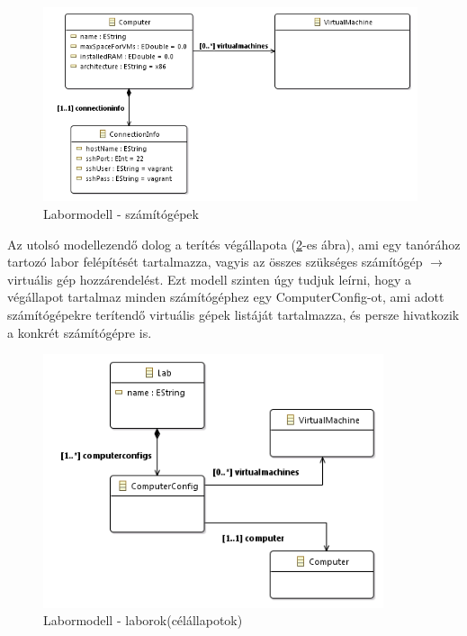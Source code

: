 \vspace{0.5cm}

\begin{figure}[ht]
	\centering
	\includegraphics[width=110mm, keepaspectratio]{figures/design_computer.png}
	\caption{Labormodell - számítógépek}
	\label{fig:designcomputers}
\end{figure}

\vspace{0.5cm}

Az utolsó modellezendő dolog a terítés végállapota (\ref{fig:designlab}-es ábra), ami egy tanórához tartozó labor felépítését tartalmazza, vagyis az összes szükséges számítógép $\rightarrow$ virtuális gép hozzárendelést. Ezt modell szinten úgy tudjuk leírni, hogy a végállapot tartalmaz minden számítógéphez egy ComputerConfig-ot, ami adott számítógépekre terítendő virtuális gépek listáját tartalmazza, és persze hivatkozik a konkrét számítógépre is.

\vspace{0.5cm}

\begin{figure}[h!]
	\centering
	\includegraphics[width=100mm, keepaspectratio]{figures/design_lab.png}
	\caption{Labormodell - laborok(célállapotok)}
	\label{fig:designlab}
\end{figure}
\FloatBarrier


